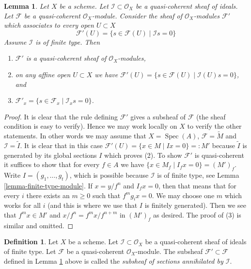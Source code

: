 \documentclass{stacks-project}
\theoremstyle{plain}
\newtheorem{lemma}[subsection]{Lemma}
\theoremstyle{definition}
\newtheorem{definition}[subsection]{Definition}
\theoremstyle{remark}
\numberwithin{equation}{subsection}
\def\Spec{\mathop{\mathrm{Spec}}}
\begin{document}
\begin{lemma}
\label{lemma-sections-annihilated-by-ideal}
Let $X$ be a scheme.
Let $\mathcal{I} \subset \mathcal{O}_X$ be a quasi-coherent sheaf of ideals.
Let $\mathcal{F}$ be a quasi-coherent $\mathcal{O}_X$-module.
Consider the sheaf of $\mathcal{O}_X$-modules $\mathcal{F}'$
which associates to every open $U \subset X$
$$
\mathcal{F}'(U)
=
\{s \in \mathcal{F}(U) \mid
\mathcal{I}s = 0\}
$$
Assume $\mathcal{I}$ is of finite type. Then
\begin{enumerate}
\item $\mathcal{F}'$ is a quasi-coherent sheaf of $\mathcal{O}_X$-modules,
\item on any affine open $U \subset X$ we have
$\mathcal{F}'(U) = \{s \in \mathcal{F}(U) \mid \mathcal{I}(U)s = 0\}$, and
\item $\mathcal{F}'_x = \{s \in \mathcal{F}_x \mid \mathcal{I}_x s = 0\}$.
\end{enumerate}
\end{lemma}

\begin{proof}
It is clear that the rule defining $\mathcal{F}'$ gives a subsheaf
of $\mathcal{F}$ (the sheaf condition is easy to verify). Hence we
may work locally on $X$ to verify the other statements. In other words
we may assume that $X = \Spec(A)$, $\mathcal{F} = \widetilde{M}$
and $\mathcal{I} = \widetilde{I}$. It is clear that in this case
$\mathcal{F}'(U) = \{x \in M \mid Ix = 0\} =: M'$ because $\widetilde{I}$
is generated by its global sections $I$ which proves (2).
To show $\mathcal{F}'$ is quasi-coherent it suffices to show that
for every $f \in A$ we have
$\{x \in M_f \mid I_f x = 0\} = (M')_f$.
Write $I = (g_1, \ldots, g_t)$, which is possible because $\mathcal{I}$
is of finite type, see Lemma \ref{lemma-finite-type-module}.
If $x = y/f^n$ and $I_fx = 0$, then that means that for every $i$
there exists an $m \geq 0$ such that $f^mg_ix = 0$.
We may choose one $m$ which works for all $i$ (and this is where we
use that $I$ is finitely generated). Then we see that $f^mx \in M'$
and $x/f^n = f^mx/f^{n + m}$ in $(M')_f$ as desired.
The proof of (3) is similar and omitted.
\end{proof}

\begin{definition}
\label{definition-subsheaf-sections-annihilated-by-ideal}
Let $X$ be a scheme.
Let $\mathcal{I} \subset \mathcal{O}_X$ be a quasi-coherent sheaf of ideals
of finite type.
Let $\mathcal{F}$ be a quasi-coherent $\mathcal{O}_X$-module.
The subsheaf $\mathcal{F}' \subset \mathcal{F}$ defined in
Lemma \ref{lemma-sections-annihilated-by-ideal} above is called
the {\it subsheaf of sections annihilated by $\mathcal{I}$}.
\end{definition}
\end{document}
